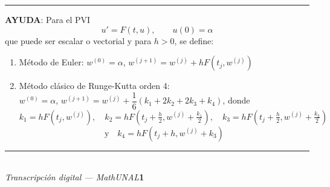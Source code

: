 \documentclass[11pt]{article}
\begin{document}
\vspace{5mm}
\noindent\rule{\linewidth}{0.3pt}

\vspace{3mm}
\noindent\textbf{AYUDA}: Para el PVI
\[
u'=F(t,u), \qquad u(0)=\alpha
\]
que puede ser escalar o vectorial y para $h>0$, se define:
\begin{enumerate}
\item Método de Euler: $w^{(0)}=\alpha$, \quad $w^{(j+1)}=w^{(j)}+hF\!\left(t_j,w^{(j)}\right)$
\item Método clásico de Runge-Kutta orden 4:\\
$w^{(0)}=\alpha$, \quad $w^{(j+1)}=w^{(j)}+\dfrac16\left(k_1+2k_2+2k_3+k_4\right)$, donde
\[
k_1=hF\!\left(t_j,w^{(j)}\right), \quad
k_2=hF\!\left(t_j+\tfrac{h}2,w^{(j)}+\tfrac{k_1}2\right), \quad
k_3=hF\!\left(t_j+\tfrac{h}2,w^{(j)}+\tfrac{k_2}2\right)
\]
\[
\text{y} \quad k_4=hF\!\left(t_j+h,w^{(j)}+k_3\right)
\]
\end{enumerate}

\vfill
\rule{\linewidth}{0.4pt}\\[1pt]
{\scriptsize\textit{Transcripción digital --- MathUNAL}\hfill\textcolor{unalblue}{\textbf{1}}}
\end{document}
